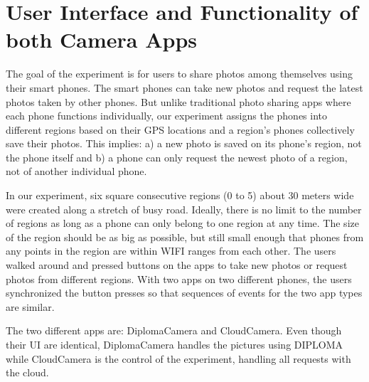 \chapter{User Interface and Functionality of both Camera Apps}

The goal of the experiment is for users to share photos among themselves using their smart phones.  The smart phones can take new photos and request the latest photos taken by other phones. But unlike traditional photo sharing apps where each phone functions individually, our experiment assigns the phones into different regions based on their GPS locations and a region’s phones collectively save their photos.  This implies: a) a new photo is saved on its phone’s region, not the phone itself and b) a phone can only request the newest photo of a region, not of another individual phone. 
 
In our experiment, six square consecutive regions (0 to 5) about 30 meters wide were created along a stretch of busy road.  Ideally, there is no limit to the number of regions as long as a phone can only belong to one region at any time. The size of the region should be as big as possible, but still small enough that phones from any points in the region are within WIFI ranges from each other. The users walked around and pressed buttons on the apps to take new photos or request photos from different regions. With two apps on two different phones, the users synchronized the button presses so that sequences of events for the two app types are similar.

The two different apps are: DiplomaCamera and CloudCamera. Even though their UI are identical, DiplomaCamera handles the pictures using DIPLOMA while CloudCamera is the control of the experiment, handling all requests with the cloud.
